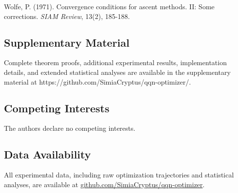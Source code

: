 Wolfe, P. (1971). Convergence conditions for ascent methods. II: Some corrections. \emph{SIAM Review}, 13(2),
185-188.

\hypertarget{supplementary-material}{%
\subsection{Supplementary Material}\label{supplementary-material}}

Complete theorem proofs, additional experimental results, implementation details, and extended statistical analyses are
available in the supplementary material at https://github.com/SimiaCryptus/qqn-optimizer/.

\hypertarget{competing-interests}{%
\subsection{Competing Interests}\label{competing-interests}}

The authors declare no competing interests.

\hypertarget{data-availability}{%
\subsection{Data Availability}\label{data-availability}}

All experimental data, including raw optimization trajectories and statistical analyses, are available at \href{https://github.com/SimiaCryptus/qqn-optimizer/}{github.com/SimiaCryptus/qqn-optimizer}.

